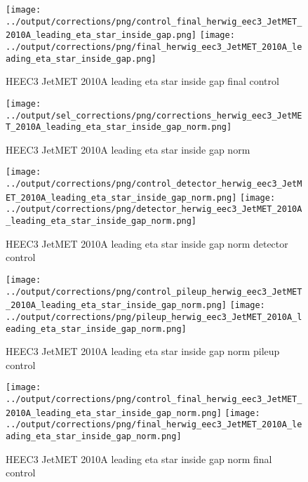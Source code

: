 \documentclass[11pt]{book}
\begin{document}
\begin{figure}[ht]
\centering
\texttt{[image: ../output/corrections/png/control\_final\_herwig\_eec3\_JetMET\_2010A\_leading\_eta\_star\_inside\_gap.png]}
\texttt{[image: ../output/corrections/png/final\_herwig\_eec3\_JetMET\_2010A\_leading\_eta\_star\_inside\_gap.png]}
\caption{HEEC3 JetMET 2010A leading eta star inside gap final control}
\label{fig:HEEC3_JetMET_2010A_leading_eta_star_inside_gap_final_control}
\end{figure}



\begin{figure}[ht]
\centering
\texttt{[image: ../output/sel\_corrections/png/corrections\_herwig\_eec3\_JetMET\_2010A\_leading\_eta\_star\_inside\_gap\_norm.png]}
\caption{HEEC3 JetMET 2010A leading eta star inside gap norm}
\label{fig:HEEC3_JetMET_2010A_leading_eta_star_inside_gap_norm}
\end{figure}

\begin{figure}[ht]
\centering
\texttt{[image: ../output/corrections/png/control\_detector\_herwig\_eec3\_JetMET\_2010A\_leading\_eta\_star\_inside\_gap\_norm.png]}
\texttt{[image: ../output/corrections/png/detector\_herwig\_eec3\_JetMET\_2010A\_leading\_eta\_star\_inside\_gap\_norm.png]}
\caption{HEEC3 JetMET 2010A leading eta star inside gap norm detector control}
\label{fig:HEEC3_JetMET_2010A_leading_eta_star_inside_gap_norm_detector_control}
\end{figure}

\begin{figure}[ht]
\centering
\texttt{[image: ../output/corrections/png/control\_pileup\_herwig\_eec3\_JetMET\_2010A\_leading\_eta\_star\_inside\_gap\_norm.png]}
\texttt{[image: ../output/corrections/png/pileup\_herwig\_eec3\_JetMET\_2010A\_leading\_eta\_star\_inside\_gap\_norm.png]}
\caption{HEEC3 JetMET 2010A leading eta star inside gap norm pileup control}
\label{fig:HEEC3_JetMET_2010A_leading_eta_star_inside_gap_norm_pileup_control}
\end{figure}


\begin{figure}[ht]
\centering
\texttt{[image: ../output/corrections/png/control\_final\_herwig\_eec3\_JetMET\_2010A\_leading\_eta\_star\_inside\_gap\_norm.png]}
\texttt{[image: ../output/corrections/png/final\_herwig\_eec3\_JetMET\_2010A\_leading\_eta\_star\_inside\_gap\_norm.png]}
\caption{HEEC3 JetMET 2010A leading eta star inside gap norm final control}
\label{fig:HEEC3_JetMET_2010A_leading_eta_star_inside_gap_norm_final_control}
\end{figure}
\end{document}
